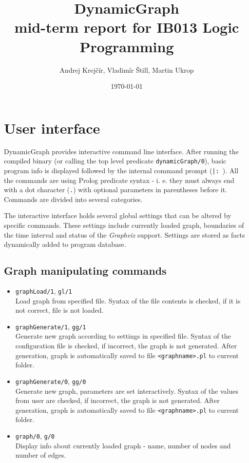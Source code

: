 \documentclass[11pt, a4paper,draft]{article}
\newcommand{\pl}[1]{\texttt{#1}} %
\theoremstyle{plain}
\theoremstyle{definition}
\theoremstyle{remark}
\newcommand{\gv}{\textit{Graphviz}}
\begin{document}
\title{{\Huge DynamicGraph} \\ {\large mid-term report for IB013 Logic Programming} }
\author{Andrej Krejčír, Vladimír Štill, Martin Ukrop}
\date{\today}
\maketitle

\section{User interface}

DynamicGraph provides interactive command line interface. After running the compiled binary (or calling the
top level predicate \pl{dynamicGraph/0}), basic program info is displayed followed by the internal command prompt (\pl{|: }).
 All the commands are using Prolog predicate syntax - i. e. they must always end with a dot character (\pl{.}) 
 with optional parameters in parentheses before it. Commands are divided into several categories.

The interactive interface holds several global settings that can be altered by specific commands. 
These settings include currently loaded graph, boundaries of the time interval and status of the \gv{} support. 
Settings are stored as facts dynamically added to program database.

\subsection{Graph manipulating commands}
\begin{itemize}
\item \pl{graphLoad/1}, \pl{gl/1} \\
Load graph from specified file. Syntax of the file contents is checked, if it is not correct, file is not loaded.

\item \pl{graphGenerate/1}, \pl{gg/1} \\
Generate new graph according to settings in specified file. 
Syntax of the configuration file is checked, if incorrect, the graph is not generated. 
After generation, graph is automatically saved to file \pl{<graphname>.pl} to current folder.

\item \pl{graphGenerate/0}, \pl{gg/0} \\
Generate new graph, parameters are set interactively. 
Syntax  of the values from user are checked, if incorrect, the graph is not generated. 
After generation, graph is automatically saved to file \pl{<graphname>.pl} to current folder.

\item \pl{graph/0}, \pl{g/0} \\
Display info about currently loaded graph - name, number of nodes and number of edges.
\end{itemize}
\end{document}
